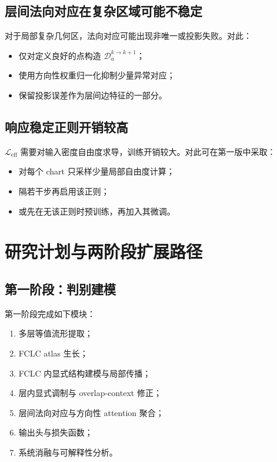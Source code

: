 \documentclass[12pt,a4paper]{ctexart}
\begin{document}
\subsection{层间法向对应在复杂区域可能不稳定}
对于局部复杂几何区，法向对应可能出现非唯一或投影失败。对此：
\begin{itemize}[leftmargin=2em]
    \item 仅对定义良好的点构造 \(\mathcal D_a^{k\to k+1}\)；
    \item 使用方向性权重归一化抑制少量异常对应；
    \item 保留投影误差作为层间边特征的一部分。
\end{itemize}

\subsection{响应稳定正则开销较高}
\(\mathcal L_{\mathrm{eff}}\) 需要对输入密度自由度求导，训练开销较大。对此可在第一版中采取：
\begin{itemize}[leftmargin=2em]
    \item 对每个 chart 只采样少量局部自由度计算；
    \item 隔若干步再启用该正则；
    \item 或先在无该正则时预训练，再加入其微调。
\end{itemize}

\section{研究计划与两阶段扩展路径}

\subsection{第一阶段：判别建模}
第一阶段完成如下模块：
\begin{enumerate}[leftmargin=2em]
    \item 多层等值流形提取；
    \item FCLC atlas 生长；
    \item FCLC 内显式结构建模与局部传播；
    \item 层内显式调制与 overlap-context 修正；
    \item 层间法向对应与方向性 attention 聚合；
    \item 输出头与损失函数；
    \item 系统消融与可解释性分析。
\end{enumerate}
\end{document}
